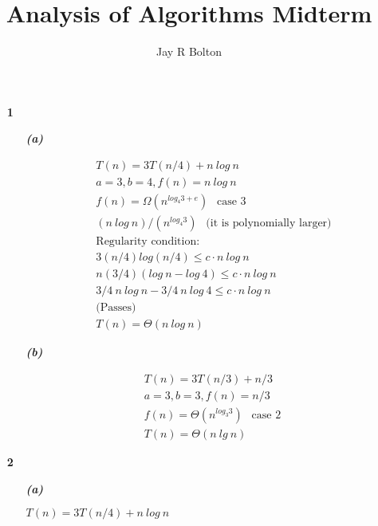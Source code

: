 \documentclass{article}
\title{Analysis of Algorithms Midterm}
\author{Jay R Bolton}
\begin{document}
\maketitle

\begin{enumerate}

\item[\textbf{1}]

	\begin{enumerate}

		\item[\textbf{\emph{{(a)}}}]

		\begin{align*}
			& T(n) = 3T(n/4) + n\ log\ n \\
			& a = 3, b = 4, f(n) = n\ log\ n \\
			& f(n) = \Omega(n^{log_4 3 + e})\ \ \text{ case 3} \\
			& (n\ log\ n) / (n^{log_4 3}) \ \ \text{ (it is polynomially larger)}\\
			& \text{Regularity condition:} \\
			& 3(n/4)log(n/4) \leq c \cdot n\ log\ n \\
			& n(3/4)(log\ n - log\ 4) \leq c \cdot n\ log\ n \\
			& 3/4\ n\ log\ n - 3/4\ n\ log\ 4 \leq c \cdot n\ log\ n \\
			& \text{(Passes)} \\\
			& T(n) = \Theta(n\ log\ n)
		\end{align*}

		\item[\textbf{\emph{{(b)}}}]

		\begin{align*}
			& T(n) = 3T(n/3) + n/3 \\
			& a = 3, b = 3, f(n) = n/3 \\
			& f(n) = \Theta(n^{log_3 3})\ \ \text{ case 2} \\
			& T(n) = \Theta(n\ lg\ n)
		\end{align*}

	\end{enumerate}

\item[\textbf{2}]

	\begin{enumerate}

		\item[\textbf{\emph{{(a)}}}]

		$T(n) = 3T(n/4) + n\ log\ n$


\end{enumerate}
\end{enumerate}
\end{document}
